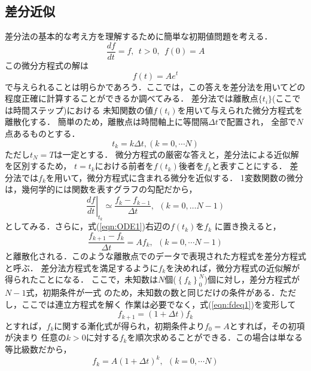 \documentclass[10pt,a4j,dvipdfmx]{jarticle}
\begin{document}
\subsection{差分近似}
差分法の基本的な考え方を理解するために簡単な初期値問題を考える．
\begin{equation}
	\frac{d f}{d t} =f, \ \ t>0, \ \ f(0)=A
	\label{eqn:ODE1}
\end{equation}
この微分方程式の解は
\begin{equation}
	f(t)=Ae^{t}
\end{equation}
で与えられることは明らかであろう．ここでは，この答えを差分法を用いてどの
程度正確に計算することができるか調べてみる．
差分法では離散点$\{t_i\}$(ここでは時間ステップ)における
未知関数の値$f(t_i)$を用いて与えられた微分方程式を離散化する．
簡単のため，離散点は時間軸上に等間隔$\Delta t$で配置され，
全部で$N$点あるものとする．
\begin{equation}
	t_k=k\Delta t,(k=0,\cdots N)
	\label{eqn:}
\end{equation}
ただし$t_N=T$は一定とする．
微分方程式の厳密な答えと，差分法による近似解を区別するため，
$t=t_k$における前者を$f(t_k)$後者を$f_k$と表すことにする．
差分法では$f_k$を用いて，微分方程式に含まれる微分を近似する．
1変数関数の微分は，幾何学的には関数を表すグラフの勾配だから，
\begin{equation}
	\left. \frac{df}{dt} \right|_{t_k} \simeq 
	\frac{f_k-f_{k-1}}{\Delta t}, \ \ (k=0,\dots N-1)
	\label{eqn:fd_1st}
\end{equation}
としてみる．さらに，式(\ref{eqn:ODE1})右辺の$f(t_k)$を$f_k$
に置き換えると，
\begin{equation}
	\frac{f_{k+1}-f_k}{\Delta t} = A f_k, \ \ (k=0,\cdots N-1)
	\label{eqn:fdeq1}
\end{equation}
と離散化される．このような離散点でのデータで表現された方程式を差分方程式と呼ぶ．
差分法方程式を満足するように$f_k$を決めれば，微分方程式の近似解が得られたことになる．
ここで，未知数は$N$個($\left\{f_k\right\}_0^N$)個に対し，差分方程式が$N-1$式，初期条件が一式
のため，未知数の数と同じだけの条件がある．ただし，ここでは連立方程式を解く
作業は必要でなく，式(\ref{eqn:fdeq1})を変形して
\begin{equation}
	f_{k+1}=(1+\Delta t) f_k
	\label{eqn:}
\end{equation}
とすれば，$f_{k}$に関する漸化式が得られ，初期条件より$f_0=A$とすれば，その初項が決まり
任意の$k>0$に対する$f_k$を順次求めることができる．この場合は単なる等比級数だから，
\begin{equation}
	f_k=A(1+\Delta t)^k, \ \ (k=0,\cdots N)
	\label{eqn:}
\end{equation}
\end{document}
